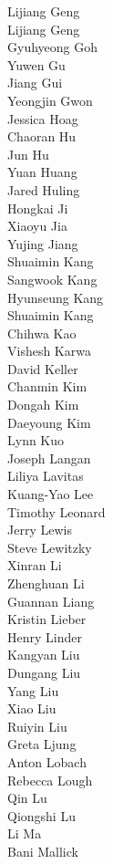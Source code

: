 Lijiang Geng\\
Lijiang Geng\\
Gyuhyeong Goh\\
Yuwen Gu\\
Jiang Gui\\
Yeongjin Gwon\\
Jessica Hoag\\
Chaoran Hu\\
Jun Hu\\
Yuan Huang\\
Jared Huling\\
Hongkai Ji\\
Xiaoyu Jia\\
Yujing Jiang\\
Shuaimin Kang\\
Sangwook Kang\\
Hyunseung Kang\\
Shuaimin Kang\\
Chihwa Kao\\
Vishesh Karwa\\
David Keller\\
Chanmin Kim\\
Dongah Kim\\
Daeyoung Kim\\
Lynn Kuo\\
Joseph Langan\\
Liliya Lavitas\\
Kuang-Yao Lee\\
Timothy Leonard\\
Jerry Lewis\\
Steve Lewitzky\\
Xinran Li\\
Zhenghuan Li\\
Guannan Liang\\
Kristin Lieber\\
Henry Linder\\
Kangyan Liu\\
Dungang Liu\\
Yang Liu\\
Xiao Liu\\
Ruiyin Liu\\
Greta Ljung\\
Anton Lobach\\
Rebecca Lough\\
Qin Lu\\
Qiongshi Lu\\
Li Ma\\
Bani Mallick\\
